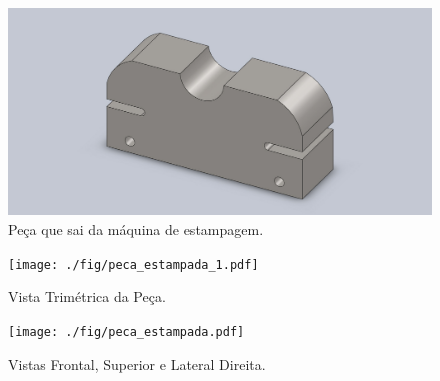 \documentclass[a4paper, 12pt]{article}
\begin{document}
\begin{figure}[h]
\begin{center}
\includegraphics[scale=0.45]{./fig/peca_estampada-acoliga.jpg}
\caption{\label{fig:2}Peça que sai da máquina de estampagem.} 
\end{center}
\end{figure}

\begin{figure}[h]
\begin{center}
\texttt{[image: ./fig/peca\_estampada\_1.pdf]}
\caption{\label{fig:2}Vista Trimétrica da Peça.} 
\end{center}
\end{figure}


\begin{figure}[h]
\begin{center}
\texttt{[image: ./fig/peca\_estampada.pdf]}
\caption{\label{fig:2}Vistas Frontal, Superior e Lateral Direita.} 
\end{center}
\end{figure}





\pagebreak
\end{document}
